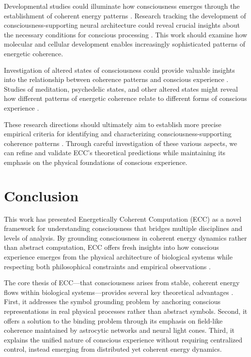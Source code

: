 \begin{refsection}
Developmental studies could illuminate how consciousness emerges through the establishment of coherent energy patterns \cite{chalmers2010character}. Research tracking the development of consciousness-supporting neural architecture could reveal crucial insights about the necessary conditions for conscious processing \cite{seth2021being}. This work should examine how molecular and cellular development enables increasingly sophisticated patterns of energetic coherence.

Investigation of altered states of consciousness could provide valuable insights into the relationship between coherence patterns and conscious experience \cite{goff2019galileo}. Studies of meditation, psychedelic states, and other altered states might reveal how different patterns of energetic coherence relate to different forms of conscious experience \cite{thompson2014waking}.

These research directions should ultimately aim to establish more precise empirical criteria for identifying and characterizing consciousness-supporting coherence patterns \cite{dennett2017bacteria}. Through careful investigation of these various aspects, we can refine and validate ECC's theoretical predictions while maintaining its emphasis on the physical foundations of conscious experience.

\section{Conclusion}

This work has presented Energetically Coherent Computation (ECC) as a novel framework for understanding consciousness that bridges multiple disciplines and levels of analysis. By grounding consciousness in coherent energy dynamics rather than abstract computation, ECC offers fresh insights into how conscious experience emerges from the physical architecture of biological systems while respecting both philosophical constraints and empirical observations \cite{thompson2014waking}.

The core thesis of ECC—that consciousness arises from stable, coherent energy flows within biological systems—provides several key theoretical advantages \cite{koch2019feeling}. First, it addresses the symbol grounding problem by anchoring conscious representations in real physical processes rather than abstract symbols. Second, it offers a solution to the binding problem through its emphasis on field-like coherence maintained by astrocytic networks and neural light cones. Third, it explains the unified nature of conscious experience without requiring centralized control, instead emerging from distributed yet coherent energy dynamics.


\end{refsection}
